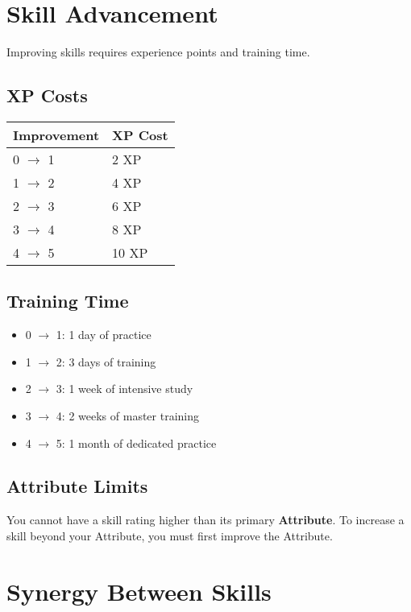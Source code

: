\section{Skill Advancement}

Improving skills requires experience points and training time.

\subsection*{XP Costs}
\begin{center}
\small
\begin{tabular}{ll}
\toprule
\textbf{Improvement} & \textbf{XP Cost} \\
\midrule
0 $\rightarrow$ 1 & 2 XP \\
1 $\rightarrow$ 2 & 4 XP \\
2 $\rightarrow$ 3 & 6 XP \\
3 $\rightarrow$ 4 & 8 XP \\
4 $\rightarrow$ 5 & 10 XP \\
\bottomrule
\end{tabular}
\end{center}

\subsection*{Training Time}
\begin{itemize}
\item 0 $\rightarrow$ 1: 1 day of practice
\item 1 $\rightarrow$ 2: 3 days of training
\item 2 $\rightarrow$ 3: 1 week of intensive study
\item 3 $\rightarrow$ 4: 2 weeks of master training
\item 4 $\rightarrow$ 5: 1 month of dedicated practice
\end{itemize}

\subsection*{Attribute Limits}
You cannot have a skill rating higher than its primary \textbf{Attribute}. To increase a skill beyond your Attribute, you must first improve the Attribute.


\section{Synergy Between Skills}

